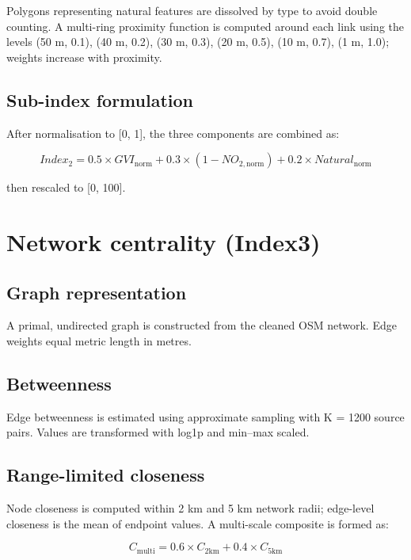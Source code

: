 \documentclass[
  12pt,
  oneside]{book}
\begin{document}
Polygons representing natural features are dissolved by type to avoid double counting. A multi-ring proximity function is computed around each link using the levels (50 m, 0.1), (40 m, 0.2), (30 m, 0.3), (20 m, 0.5), (10 m, 0.7), (1 m, 1.0); weights increase with proximity.

\subsection{Sub-index formulation}\label{sub-index-formulation}

After normalisation to {[}0, 1{]}, the three components are combined as:

\[Index_{2} = 0.5 \times GVI_{\text{norm}} + 0.3 \times (1 - NO_{2,\text{norm}}) + 0.2 \times Natural_{\text{norm}}\]

then rescaled to {[}0, 100{]}.

\section{Network centrality (Index3)}\label{network-centrality-index3}

\subsection{Graph representation}\label{graph-representation}

A primal, undirected graph is constructed from the cleaned OSM network. Edge weights equal metric length in metres.

\subsection{Betweenness}\label{betweenness}

Edge betweenness is estimated using approximate sampling with K = 1200 source pairs. Values are transformed with log1p and min--max scaled.

\subsection{Range-limited closeness}\label{range-limited-closeness}

Node closeness is computed within 2 km and 5 km network radii; edge-level closeness is the mean of endpoint values. A multi-scale composite is formed as:

\[C_{\text{multi}} = 0.6 \times C_{2\text{km}} + 0.4 \times C_{5\text{km}}\]
\end{document}
